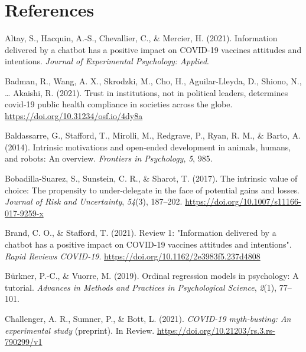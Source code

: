 \documentclass[
  english,
  ,jou,floatsintext]{apa6}
\newlength{\cslhangindent}
\newlength{\cslentryspacingunit} %
\newenvironment{CSLReferences}[2] %
 {%
  \setlength{\parindent}{0pt}
  \ifodd #1
  \let\oldpar\par
  \def\par{\hangindent=\cslhangindent\oldpar}
  \fi
  \setlength{\parskip}{#2\cslentryspacingunit}
 }%
 {}
\begin{document}
\hypertarget{references}{%
\section*{References}\label{references}}

\hypertarget{refs}{}
\begin{CSLReferences}{1}{0}
\leavevmode{}%
Altay, S., Hacquin, A.-S., Chevallier, C., \& Mercier, H. (2021). Information delivered by a chatbot has a positive impact on COVID-19 vaccines attitudes and intentions. \emph{Journal of Experimental Psychology: Applied}.

\leavevmode{}%
Badman, R., Wang, A. X., Skrodzki, M., Cho, H., Aguilar-Lleyda, D., Shiono, N., \ldots{} Akaishi, R. (2021). Trust in institutions, not in political leaders, determines covid-19 public health compliance in societies across the globe. \url{https://doi.org/10.31234/osf.io/4dy8a}

\leavevmode{}%
Baldassarre, G., Stafford, T., Mirolli, M., Redgrave, P., Ryan, R. M., \& Barto, A. (2014). Intrinsic motivations and open-ended development in animals, humans, and robots: An overview. \emph{Frontiers in Psychology}, \emph{5}, 985.

\leavevmode{}%
Bobadilla-Suarez, S., Sunstein, C. R., \& Sharot, T. (2017). The intrinsic value of choice: {The} propensity to under-delegate in the face of potential gains and losses. \emph{Journal of Risk and Uncertainty}, \emph{54}(3), 187--202. \url{https://doi.org/10.1007/s11166-017-9259-x}

\leavevmode{}%
Brand, C. O., \& Stafford, T. (2021). Review 1: "Information delivered by a chatbot has a positive impact on COVID-19 vaccines attitudes and intentions". \emph{Rapid Reviews COVID-19}. \url{https://doi.org/10.1162/2e3983f5.237d4808}

\leavevmode{}%
Bürkner, P.-C., \& Vuorre, M. (2019). Ordinal regression models in psychology: A tutorial. \emph{Advances in Methods and Practices in Psychological Science}, \emph{2}(1), 77--101.

\leavevmode{}%
Challenger, A. R., Sumner, P., \& Bott, L. (2021). \emph{{COVID}-19 myth-busting: An experimental study} (preprint). In Review. \url{https://doi.org/10.21203/rs.3.rs-790299/v1}


\end{CSLReferences}
\end{document}

